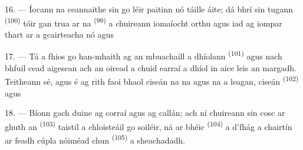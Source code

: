 16. --- Íocann na ceannaithe sin go léir paitinn nó táille áite; dá bhrí sin
tugann  \textsuperscript{(100)} tóir gan trua ar na  \textsuperscript{(99)} a chuireann iomaíocht orthu agus iad ag
iompar thart ar a gcairteacha  nó
 agus

\VUsaut{4.0mm}
\VUsaut{3.0mm}

17. --- Tá a fhios go han-mhaith ag an mbuachaill a dhíolann 
\textsuperscript{(101)} agus  nach bhfuil cead aigesean ach an
oiread a chuid earraí a dhíol in aice leis an margadh. Teitheann sé, agus é ag rith
faoi bhaol ciseán na  na  agus na  a leagan, ciseán  \textsuperscript{(102)}
 agus 

18. --- Bíonn gach duine ag corraí agus ag callán; ach ní chuireann sin cosc ar ghuth
an  \textsuperscript{(103)} taistil a chloisteáil go soiléir, ná
ar bhéic  \textsuperscript{(104)} a d'fhág a chairtín ar feadh
cúpla nóiméad chun  \textsuperscript{(105)} a sheachadadh.
